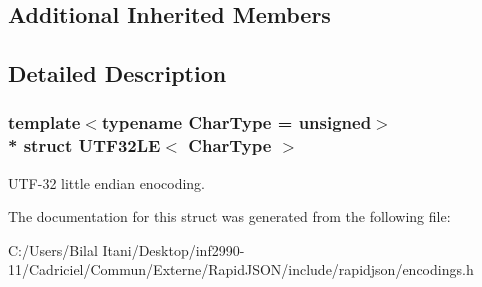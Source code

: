 \subsection*{Additional Inherited Members}


\subsection{Detailed Description}
\subsubsection*{template$<$typename Char\+Type = unsigned$>$\\*
struct U\+T\+F32\+L\+E$<$ Char\+Type $>$}

U\+T\+F-\/32 little endian enocoding. 

The documentation for this struct was generated from the following file\+:\begin{DoxyCompactItemize}
\item 
C\+:/\+Users/\+Bilal Itani/\+Desktop/inf2990-\/11/\+Cadriciel/\+Commun/\+Externe/\+Rapid\+J\+S\+O\+N/include/rapidjson/encodings.\+h\end{DoxyCompactItemize}
